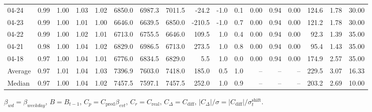 \begin{threeparttable}
{\begin{tabular}{lrrrrrrrrrrrrrrrr}
  04-24 &         0.99 &           1.00 &          1.03 &          1.02 & 6850.0 & 6987.3 & 7011.5 &      -24.2 &                     -1.0 &                 0.1 &       0.00 &      0.94 &           0.00 &            124.6 &            1.78 &                  30.00 \\
  04-23 &         0.99 &           1.00 &          1.01 &          1.00 & 6646.0 & 6639.5 & 6850.0 &     -210.5 &                     -1.0 &                 0.7 &       0.00 &      0.94 &           0.00 &            121.2 &            1.78 &                  30.00 \\
  04-22 &         0.99 &           1.00 &          1.02 &          1.01 & 6713.0 & 6755.5 & 6646.0 &      109.5 &                      1.0 &                 0.4 &       0.00 &      0.94 &           0.00 &             92.3 &            1.39 &                  35.00 \\
  04-21 &         0.98 &           1.00 &          1.04 &          1.02 & 6829.0 & 6986.5 & 6713.0 &      273.5 &                      1.0 &                 0.8 &       0.00 &      0.94 &           0.00 &             95.4 &            1.43 &                  35.00 \\
  04-18 &         0.97 &           1.00 &          1.04 &          1.01 & 6776.0 & 6834.5 & 6829.0 &        5.5 &                      1.0 &                 0.0 &       0.00 &      0.94 &           0.00 &            174.9 &            2.57 &                  35.00 \\
Average &         0.97 &           1.01 &          1.04 &          1.03 & 7396.9 & 7603.0 & 7418.0 &      185.0 &                      0.5 &                 1.0 &         -- &        -- &             -- &            229.5 &            3.07 &                  16.33 \\
 Median &         0.97 &           1.00 &          1.04 &          1.02 & 7457.5 & 7597.1 & 7457.5 &      252.0 &                      1.0 &                 0.9 &         -- &        -- &             -- &            203.2 &            2.69 &                  10.00 \\
\bottomrule
\end{tabular}
}
\begin{tablenotes}\footnotesize
\item $\beta_{wd}=\beta_{weekday}$, $B=B_{t-1}$,
$C_p=C_{\text{pred}}\beta_{evt}$, $C_r=C_{\text{real}}$,
$C_\Delta=C_{\text{diff}}$, $|C_\Delta|/\sigma=|C_{\text{diff}}|/\sigma_t^{\text{shift}}$.
\end{tablenotes}
\end{threeparttable}
\endgroup
